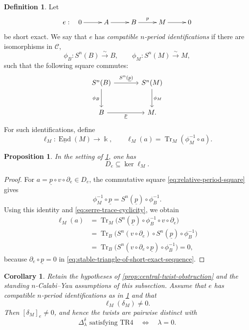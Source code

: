 \documentclass[a4paper,11pt,reqno]{amsart}
\newtheorem{proposition}[proposition]{Proposition}
\newtheorem{corollary}[corollary]{Corollary}
\theoremstyle{definition}
\newtheorem{definition}[definition]{Definition}
\theoremstyle{plain}
\numberwithin{equation}{section}
\newcommand{\C}{\mathcal C}
\newcommand{\End}{\operatorname{End}}
\newcommand{\kk}{\Bbbk}
\begin{document}
\begin{definition}
\label{def:trace-functional}
Let
\begin{equation*}
\xymatrix@C=2.2pc{
e:\quad0\ar[r]&A\ar[r]&B\ar[r]^-{p}&M\ar[r]&0
}
\end{equation*}
be short exact.  We say that \(e\) has \emph{compatible
\(n\)-period identifications} if there are isomorphisms in \(\C\),
\[
 \phi_B:S^n(B)\xrightarrow{\sim}B,
 \qquad
 \phi_M:S^n(M)\xrightarrow{\sim}M,
\]
such that the following square commutes:
\begin{equation}
\label{eq:relative-period-square}
\begin{tikzcd}[column sep=large,row sep=large]
S^n(B)\arrow[r,"S^n(\underline p)"]
 \arrow[d,"\phi_B"']&
S^n(M)\arrow[d,"\phi_M"]\\
B\arrow[r,"\underline p"']&M.
\end{tikzcd}
\end{equation}
For such identifications, define
\[
 \ell_M:\underline{\End}(M)\longrightarrow\kk,
 \qquad
 \ell_M(a)=\operatorname{Tr}_M(\phi_M^{-1}\circ a).
\]
\end{definition}

\begin{proposition}
\label{prop:trace-separation}
In the setting of \cref{def:trace-functional}, one has
\[
 D_e\subseteq\ker\ell_M.
\]
\end{proposition}

\begin{proof}
For \(a=\underline p\circ v\circ\partial_e\in D_e\),
the commutative square \eqref{eq:relative-period-square} gives
\[
 \phi_M^{-1}\circ\underline p
 =S^n(\underline p)\circ\phi_B^{-1}.
\]
Using this identity and \eqref{eq:serre-trace-cyclicity}, we obtain
\[
\begin{aligned}
 \ell_M(a)
 &=\operatorname{Tr}_M
   \bigl(S^n(\underline p)\circ\phi_B^{-1}\circ
   v\circ\partial_e\bigr)\\
 &=\operatorname{Tr}_B
   \bigl(S^n(v\circ\partial_e)\circ
   S^n(\underline p)\circ\phi_B^{-1}\bigr)\\
 &=\operatorname{Tr}_B
   \bigl(S^n(v\circ\partial_e\circ\underline p)
   \circ\phi_B^{-1}\bigr)=0,
\end{aligned}
\]
because \(\partial_e\circ\underline p=0\) in
\eqref{eq:stable-triangle-of-short-exact-sequence}.
\end{proof}

\begin{corollary}
\label{cor:trace-detector}
Retain the hypotheses of \cref{prop:central-twist-obstruction} and the
standing \(n\)-Calabi--Yau assumptions of this subsection.  Assume that
\(e\) has compatible \(n\)-period identifications as in
\cref{def:trace-functional} and that
\[
 \ell_M(\delta_M)\ne0.
\]
Then \([\delta_M]_e\ne0\), and hence the twists are pairwise distinct with
\[
 \Delta_\lambda^\delta\text{ satisfying }\mathrm{TR4}
 \quad\Longleftrightarrow\quad
 \lambda=0.
\]
\end{corollary}
\end{document}
